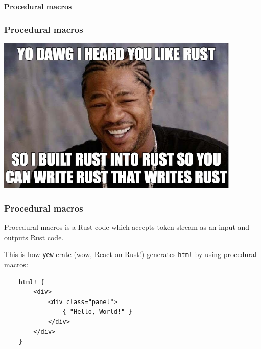 \documentclass[aspectratio=1610,t]{beamer}
\begin{document}

\begin{frame}[c]
\centering\Huge\textbf{Procedural macros}
\end{frame}


\begin{frame}[c]
\frametitle{Procedural macros}
\begin{center}
    \includegraphics[height=7.5cm,keepaspectratio]{images/yo-dawg.jpeg}
\end{center}
\end{frame}


\begin{frame}[fragile]
\frametitle{Procedural macros}
Procedural macros is a Rust code which accepts token stream as an input and outputs Rust code.

This is how \texttt{yew} crate (wow, React on Rust!) generates \texttt{html} by using procedural macros:

\begin{verbatim}
    html! {
        <div>
            <div class="panel">
                { "Hello, World!" }
            </div>
        </div>
    }
\end{verbatim}
\end{frame}

\end{document}
